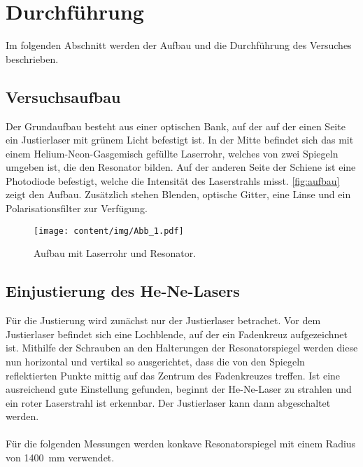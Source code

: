 \section{Durchführung}
\label{sec:durchfuehrung}

    Im folgenden Abschnitt werden der Aufbau und die Durchführung des Versuches beschrieben.

\subsection{Versuchsaufbau}
\label{sec:versuchsaufbau}

    Der Grundaufbau besteht aus einer optischen Bank, %
    auf der auf der einen Seite ein Justierlaser mit grünem Licht befestigt ist.
    In der Mitte befindet sich das mit einem Helium-Neon-Gasgemisch gefüllte Laserrohr,
    welches von zwei Spiegeln umgeben ist,
    die den Resonator bilden.
    Auf der anderen Seite der Schiene ist eine Photodiode befestigt,
    welche die Intensität des Laserstrahls misst.
    \autoref{fig:aufbau} zeigt den Aufbau.
    Zusätzlich stehen Blenden, optische Gitter, eine Linse und ein Polarisationsfilter zur Verfügung.

    \begin{figure}
      \centering
      \texttt{[image: content/img/Abb\_1.pdf]}
      \caption{Aufbau mit Laserrohr und Resonator.}
      \label{fig:aufbau}
    \end{figure}


\subsection{Einjustierung des He-Ne-Lasers}

    Für die Justierung wird zunächst nur der Justierlaser betrachet.
    Vor dem Justierlaser befindet sich eine Lochblende,
    auf der ein Fadenkreuz aufgezeichnet ist.
    Mithilfe der Schrauben an den Halterungen der Resonatorspiegel werden diese nun horizontal und vertikal so ausgerichtet,
    dass die von den Spiegeln reflektierten Punkte mittig auf das Zentrum des Fadenkreuzes treffen.
    Ist eine ausreichend gute Einstellung gefunden,
    beginnt der He-Ne-Laser zu strahlen
    und ein roter Laserstrahl ist erkennbar.
    Der Justierlaser kann dann abgeschaltet werden.\\
    \\
    Für die folgenden Messungen werden konkave Resonatorspiegel mit einem Radius von \SI{1400}{\milli\meter} verwendet.


